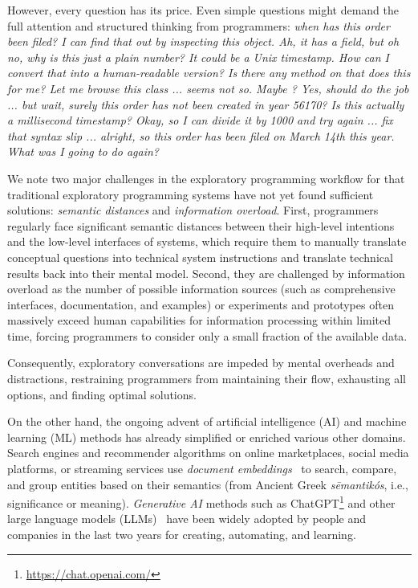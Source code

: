 \ParSep

However, every question has its price.
Even simple questions might demand the full attention and structured thinking from programmers:
\emph{%
	when has this order been filed? I can find that out by inspecting this object. Ah, it has a  field, but oh no, why is this just a plain number? It could be a Unix timestamp. How can I convert that into a human-readable version? Is there any method on  that does this for me? Let me browse this class ... seems not so. Maybe ? Yes,  should do the job ... but wait, surely this order has not been created in year 56170? Is this actually a millisecond timestamp? Okay, so I can divide it by 1000 and try again ... fix that syntax slip ... alright, so this order has been filed on March 14th this year. What was I going to do again?
}%

We note two major challenges in the exploratory programming workflow for that traditional exploratory programming systems have not yet found sufficient solutions: \emph{semantic distances} and \emph{information overload}.
First, programmers regularly face significant semantic distances between their high-level intentions and the low-level interfaces of systems, which require them to manually translate conceptual questions into technical system instructions and translate technical results back into their mental model.
Second, they are challenged by information overload as the number of possible information sources (such as comprehensive interfaces, documentation, and examples) or experiments and prototypes often massively exceed human capabilities for information processing within limited time, forcing programmers to consider only a small fraction of the available data.

Consequently, exploratory conversations are impeded by mental overheads and distractions, restraining programmers from maintaining their flow, exhausting all options, and finding optimal solutions.

\ParSep

On the other hand, the ongoing advent of artificial intelligence (AI) and machine learning (ML) methods has already simplified or enriched various other domains.
Search engines and recommender algorithms on online marketplaces, social media platforms, or streaming services use \emph{document embeddings}~\cite{mikolov2013efficient,reimers2019sentencebert} to search, compare, and group entities based on their semantics (from Ancient Greek \emph{sēmantikós}, i.e., significance or meaning).
\emph{Generative AI} methods such as ChatGPT\footnote{\url{https://chat.openai.com/}} and other large language models (LLMs)~\cite{vaswani2017attention,radford2018improving,zhao2023survey} have been widely adopted by people and companies in the last two years for creating, automating, and learning.

